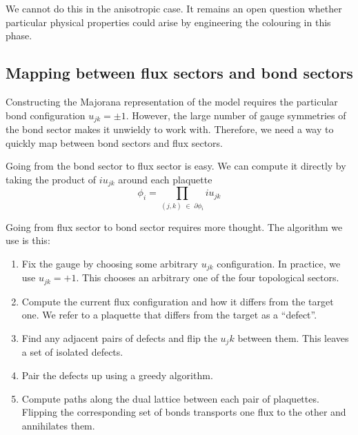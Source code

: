 We cannot do this in the anisotropic case. It remains an open question whether particular physical properties could arise by engineering the colouring in this phase.

\hypertarget{mapping-between-flux-sectors-and-bond-sectors}{%
\subsection{Mapping between flux sectors and bond sectors}\label{mapping-between-flux-sectors-and-bond-sectors}}

Constructing the Majorana representation of the model requires the particular bond configuration \(u_{jk} = \pm 1\). However, the large number of gauge symmetries of the bond sector makes it unwieldy to work with. Therefore, we need a way to quickly map between bond sectors and flux sectors.

Going from the bond sector to flux sector is easy. We can compute it directly by taking the product of \(i u_{jk}\) around each plaquette \[ \phi_i = \prod_{(j,k) \; \in \; \partial \phi_i} i u_{jk}\]

Going from flux sector to bond sector requires more thought. The algorithm we use is this:

\begin{enumerate}
\def\labelenumi{\arabic{enumi}.}
\item
  Fix the gauge by choosing some arbitrary \(u_{jk}\) configuration. In practice, we use \(u_{jk} = +1\). This chooses an arbitrary one of the four topological sectors.
\item
  Compute the current flux configuration and how it differs from the target one. We refer to a plaquette that differs from the target as a ``defect''.
\item
  Find any adjacent pairs of defects and flip the \(u_jk\) between them. This leaves a set of isolated defects.
\item
  Pair the defects up using a greedy algorithm.
\item
  Compute paths along the dual lattice between each pair of plaquettes. Flipping the corresponding set of bonds transports one flux to the other and annihilates them.
\end{enumerate}

